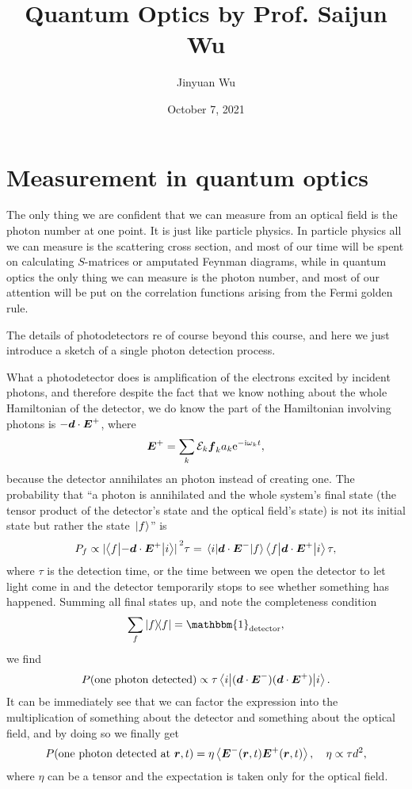 \documentclass[hyperref, a4paper]{article}
\title{Quantum Optics by Prof. Saijun Wu}
\author{Jinyuan Wu}
\date{October 7, 2021}
\newcommand*{\ii}{\mathrm{i}}
\newcommand*{\ee}{\mathrm{e}}
\begin{document}
\maketitle

\section{Measurement in quantum optics}

The only thing we are confident that we can measure from an optical field is the photon number at one point.
It is just like particle physics. In particle physics all we can measure is the scattering cross section, 
and most of our time will be spent on calculating $S$-matrices or amputated Feynman diagrams, 
while in quantum optics the only thing we can measure is the photon number, and most of our attention will be 
put on the correlation functions arising from the Fermi golden rule. 

The details of photodetectors re of course beyond this course, and here we just introduce a sketch of a single photon detection process.

What a photodetector does is amplification of the electrons excited by incident photons, 
and therefore despite the fact that we know nothing about the whole Hamiltonian of the detector, we do know the part of the Hamiltonian involving photons is $- \vb*{d} \cdot \vb*{E}^+$, where 
\begin{equation}
    \vb*{E}^+ = \sum_k \mathcal{E}_k \vb*{f}_k a_k \ee^{- \ii \omega_k t},
\end{equation}
because the detector annihilates an photon instead of creating one.
The probability that ``a photon is annihilated and the whole system's final state (the tensor product of the detector's state and the optical field's state) is not its initial state but rather the state $\ket*{f}$'' is 
\[
    P_f \propto \abs*{\mel**{f}{- \vb*{d} \cdot \vb*{E}^+}{i}}^2 \tau = \mel{i}{\vb*{d} \cdot \vb*{E}^-}{f} \mel**{f}{\vb*{d} \cdot \vb*{E}^+}{i} \tau,
\]
where $\tau$ is the detection time, or the time between we open the detector to let light come in and the detector temporarily stops to see whether something has happened.
Summing all final states up, and note the completeness condition
\[
    \sum_f \dyad{f} = \mathbbm{1}_\text{detector}, 
\]
we find 
\[
    P(\text{one photon detected}) \propto \tau \mel**{i}{(\vb*{d} \cdot \vb*{E}^-) (\vb*{d} \cdot \vb*{E}^+)}{i}.
\]
It can be immediately see that we can factor the expression into the multiplication of something about the detector and something about the optical field, and by doing so we finally get 
\begin{equation}
    P(\text{one photon detected at $\vb*{r}, t$}) = \eta \expval{\vb*{E}^-(\vb*{r}, t) \vb*{E}^+(\vb*{r}, t)}, \quad \eta \propto \tau d^2,
\end{equation}
where $\eta$ can be a tensor and the expectation is taken only for the optical field.
\end{document}

